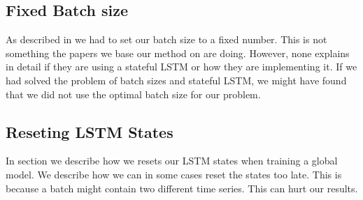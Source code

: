 

\subsection{Fixed Batch size}
As described in  we had to set our batch size to
a fixed number. This is not something the papers we base our method on are doing. However,
none explains in detail if they are using a stateful LSTM or how they are implementing it.
If we had solved the problem of batch sizes and stateful LSTM, we might have found that we did not
use the optimal batch size for our problem.

\subsection{Reseting LSTM States}
In section  we describe how we resets our LSTM states
when training a global model. We describe how we can
in some cases reset the states too late. This is because a batch might contain two different time series.
This can hurt our results.

